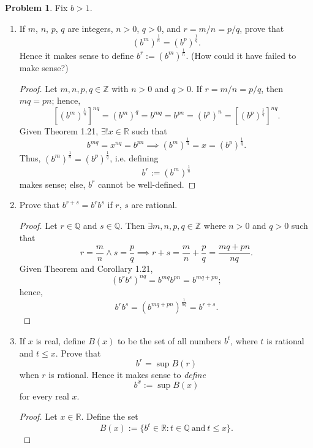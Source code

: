 \documentclass{amsart}
\theoremstyle{definition}
\newtheorem{problem}{Problem}
\begin{document}
\begin{problem}
    Fix $b > 1$.
    \begin{enumerate}[label = (\alph*)]
        \item  If $m$, $n$, $p$, $q$ are integers, $n>0$, $q>0$, and $r = m/n = p/q$, prove that 
        \[
        (b^m)^{\frac{1}{n}} = (b^p)^{\frac{1}{q}}.
        \]
        Hence it makes sense to define $b^r := (b^m)^{\frac{1}{n}}$. (How could it have failed to make sense?)
        \begin{proof}
            Let $m,n,p,q \in \mathbb{Z}$ with $n > 0$ and $q > 0$. If $r = m/n = p/q$, then $mq = pn$; hence,
            \[
            [(b^m)^{\frac{1}{n}}]^{nq} = (b^m)^q = b^{mq} = b^{pn} = (b^p)^n = [(b^p)^{\frac{1}{q}}]^{nq}.
            \]
            Given Theorem 1.21, $\exists ! x \in \mathbb{R}$ such that 
            \[
            b^{mq} = x^{nq} = b^{pn} \implies (b^m)^{\frac{1}{n}} = x = (b^p)^{\frac{1}{q}}.
            \]
            Thus, $(b^m)^{\frac{1}{n}} = (b^p)^{\frac{1}{q}}$, i.e. defining
            \[
            b^r := (b^m)^{\frac{1}{n}}
            \]
            makes sense; else, $b^r$ cannot be well-defined.
        \end{proof}        
        \item Prove that $b^{r+s} = b^rb^s$ if $r$, $s$ are rational. 
        \begin{proof}
            Let $r \in \mathbb{Q}$ and $s \in \mathbb{Q}$. Then $\exists m,n,p,q \in \mathbb{Z}$ where $n > 0$ and $q > 0$ such that
            \[
            r = \frac{m}{n} \land s = \frac{p}{q} \implies r + s = \frac{m}{n} + \frac{p}{q} = \frac{mq+pn}{nq}.
            \]
            Given Theorem and Corollary 1.21, 
            \[
            (b^rb^s)^{nq} = b^{mq}b^{pn} = b^{mq+pn};
            \]
            hence,
            \[
            b^rb^s = (b^{mq+pn})^{\frac{1}{nq}} = b^{r+s}.
            \]
        \end{proof}        
        \item If $x$ is real, define $B(x)$ to be the set of all numbers $b^t$, where $t$ is rational and $t \leq x$. Prove that
        \[
        b^r = \sup B(r)        
        \]
        when $r$ is rational. Hence it makes sense to \textit{define}
        \[
        b^x := \sup B(x)
        \]
        for every real $x$.
        \begin{proof}
            Let $x \in \mathbb{R}$. Define the set
            \[
            B(x) := \{b^t \in \mathbb{R} : t \in \mathbb{Q} \ \text{and} \ t \leq x\}.
            \]

\end{proof}
\end{enumerate}
\end{problem}
\end{document}
